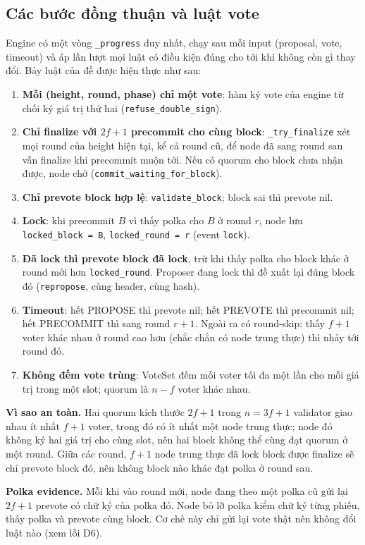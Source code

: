 \documentclass[11pt,a4paper]{article}
\newcommand{\code}[1]{\texttt{#1}}
\begin{document}
\subsection{Các bước đồng thuận và luật vote}
Engine có một vòng \code{\_progress} duy nhất, chạy sau mỗi input (proposal, vote, timeout) và áp lần lượt mọi luật có điều kiện đúng cho tới khi không còn gì thay đổi. Bảy luật của đề được hiện thực như sau:
\begin{enumerate}
\item \textbf{Mỗi (height, round, phase) chỉ một vote}: hàm ký vote của engine từ chối ký giá trị thứ hai (\code{refuse\_double\_sign}).
\item \textbf{Chỉ finalize với $2f+1$ precommit cho cùng block}: \code{\_try\_finalize} xét mọi round của height hiện tại, kể cả round cũ, để node đã sang round sau vẫn finalize khi precommit muộn tới. Nếu có quorum cho block chưa nhận được, node chờ (\code{commit\_waiting\_for\_block}).
\item \textbf{Chỉ prevote block hợp lệ}: \code{validate\_block}; block sai thì prevote nil.
\item \textbf{Lock}: khi precommit $B$ vì thấy polka cho $B$ ở round $r$, node lưu \code{locked\_block = B}, \code{locked\_round = r} (event \code{lock}).
\item \textbf{Đã lock thì prevote block đã lock}, trừ khi thấy polka cho block khác ở round mới hơn \code{locked\_round}. Proposer đang lock thì đề xuất lại đúng block đó (\code{repropose}, cùng header, cùng hash).
\item \textbf{Timeout}: hết PROPOSE thì prevote nil; hết PREVOTE thì precommit nil; hết PRECOMMIT thì sang round $r+1$. Ngoài ra có round-skip: thấy $f+1$ voter khác nhau ở round cao hơn (chắc chắn có node trung thực) thì nhảy tới round đó.
\item \textbf{Không đếm vote trùng}: VoteSet đếm mỗi voter tối đa một lần cho mỗi giá trị trong một slot; quorum là $n - f$ voter khác nhau.
\end{enumerate}

\textbf{Vì sao an toàn.} Hai quorum kích thước $2f+1$ trong $n = 3f+1$ validator giao nhau ít nhất $f+1$ voter, trong đó có ít nhất một node trung thực; node đó không ký hai giá trị cho cùng slot, nên hai block không thể cùng đạt quorum ở một round. Giữa các round, $f+1$ node trung thực đã lock block được finalize sẽ chỉ prevote block đó, nên không block nào khác đạt polka ở round sau.

\textbf{Polka evidence.} Mỗi khi vào round mới, node đang theo một polka cũ gửi lại $2f+1$ prevote có chữ ký của polka đó. Node bỏ lỡ polka kiểm chữ ký từng phiếu, thấy polka và prevote cùng block. Cơ chế này chỉ gửi lại vote thật nên không đổi luật nào (xem lỗi D6).
\end{document}
